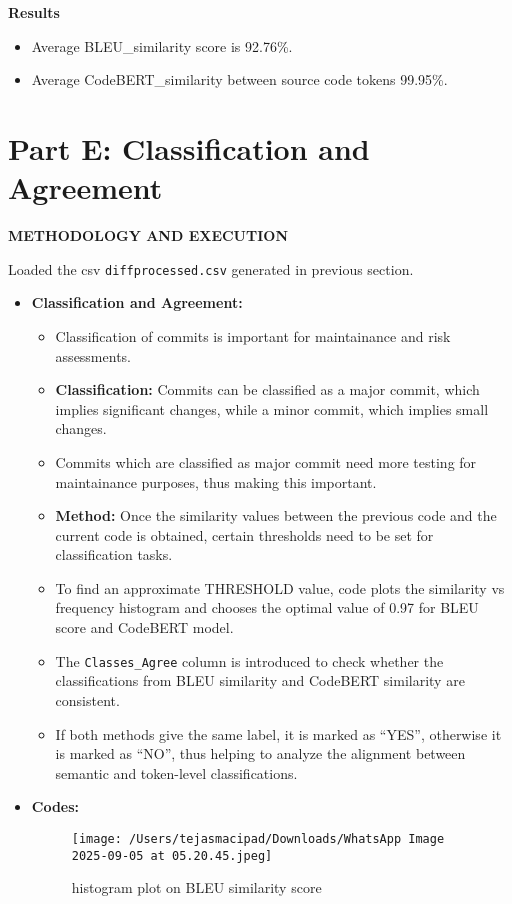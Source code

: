 \documentclass[12pt, a4paper]{report}
\newcommand{\sectionbar}[1]{%
  \vspace{0.6\baselineskip}%
  \noindent
  \colorbox{sectionbar}{%
    \parbox{\dimexpr\linewidth-2\fboxsep\relax}{%
      \textbf{\Large\textsf{#1}}%
    }%
  }%
  \vspace{0.6\baselineskip}
}
\begin{document}
\newpage
\sectionbar{Results}
\begin{itemize}
    \item Average BLEU\_similarity score is 92.76\%.
    \item Average CodeBERT\_similarity between source code tokens 99.95\%.
\end{itemize}

\section{Part E: Classification and Agreement}

\sectionbar{METHODOLOGY AND EXECUTION}
Loaded the csv \texttt{diffprocessed.csv} generated in previous section.

\begin{itemize}
    \item \textbf{Classification and Agreement:}
    \begin{itemize}
        \item Classification of commits is important for maintainance and risk assessments.
        \item \textbf{Classification: } Commits can be classified as a major commit, which implies significant changes, while a minor commit, which implies small changes.
        \item Commits which are classified as major commit need more testing for maintainance purposes, thus making this important.
        \item \textbf{Method: } Once the similarity values between the previous code and the current code is obtained, certain thresholds need to be set for classification tasks.
        \item To find an approximate THRESHOLD value, code plots the similarity vs frequency histogram and chooses the optimal value of 0.97 for BLEU score and CodeBERT model.
        \item The \texttt{Classes\_Agree} column is introduced to check whether the classifications from BLEU similarity and CodeBERT similarity are consistent.  
        \item If both methods give the same label, it is marked as ``YES'', otherwise it is marked as ``NO'', thus helping to analyze the alignment between semantic and token-level classifications.
    \end{itemize}

    \newpage
    \item \textbf{Codes:}
        \begin{figure}[!h] 
            \centering
            \texttt{[image: /Users/tejasmacipad/Downloads/WhatsApp Image 2025-09-05 at 05.20.45.jpeg]}
            \caption{histogram plot on BLEU similarity score}
            \label{fig:diff-example-14}
        \end{figure}


\end{itemize}
\end{document}
